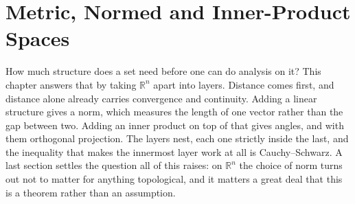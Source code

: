 \chapter{Metric, Normed and Inner-Product Spaces}
\label{ch:metric_spaces}

How much structure does a set need before one can do analysis on it? This chapter answers that by
taking $\mathbb{R}^n$ apart into layers. Distance comes first, and distance alone already carries
convergence and continuity. Adding a linear structure gives a norm, which measures the length of
one vector rather than the gap between two. Adding an inner product on top of that gives angles,
and with them orthogonal projection. The layers nest, each one strictly inside the last, and the
inequality that makes the innermost layer work at all is Cauchy--Schwarz. A last section settles
the question all of this raises: on $\mathbb{R}^n$ the choice of norm turns out not to matter for
anything topological, and it matters a great deal that this is a theorem rather than an
assumption.






